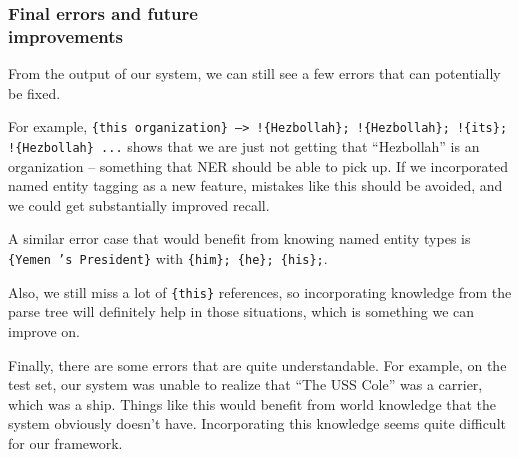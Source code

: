 \documentclass[12pt, twocolumn]{article}
\begin{document}
\subsubsection{Final errors and future\\ improvements}
From the output of our system, we can still see a few errors that can potentially be fixed.

For example, \texttt{\{this organization\} --> !\{Hezbollah\}; !\{Hezbollah\}; !\{its\}; !\{Hezbollah\} ...} shows that we are just not getting that ``Hezbollah'' is an organization -- something that NER should be able to pick up. If we incorporated named entity tagging as a new feature, mistakes like this should be avoided, and we could get substantially improved recall.

A similar error case that would benefit from knowing named entity types is \texttt{\{Yemen 's President\}} with \texttt{\{him\}; \{he\}; \{his\};}.

Also, we still miss a lot of \texttt{\{this\}} references, so incorporating knowledge from the parse tree will definitely help in those situations, which is something we can improve on.

Finally, there are some errors that are quite understandable. For example, on the test set, our system was unable to realize that ``The USS Cole'' was a carrier, which was a ship. Things like this would benefit from world knowledge that the system obviously doesn't have. Incorporating this knowledge seems quite difficult for our framework.
\end{document}
